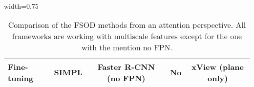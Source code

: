 \begin{table}[h]
\begin{adjustbox}{width=0.75\textwidth}
\begin{tabular}{@{}llccc}
            \multirow{-9}{*}{\cellcolor{white}\parbox{1.5cm}{\textbf{Fine-tuning}}}              & SIMPL \parencite{xu2022simpl}                     & Faster R-CNN (no FPN)      & No                          & xView (plane only)                 \\ \bottomrule[1pt]
            \end{tabular}%
    \end{adjustbox}
    \caption{Comparison of the FSOD methods from an attention perspective. All
    frameworks are working with multiscale features except for the one with the
    mention no FPN.}

\end{table}